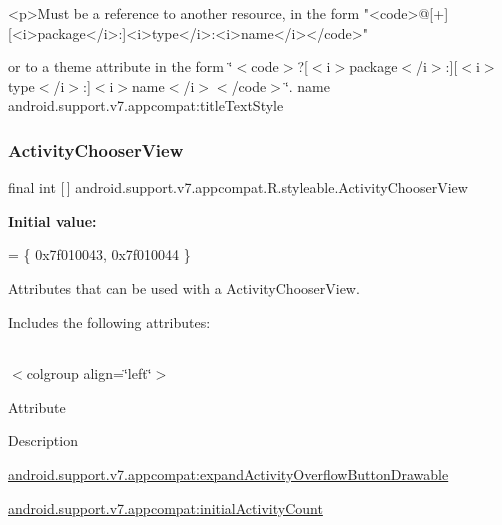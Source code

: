\begin{DoxyVerb}      <p>Must be a reference to another resource, in the form "<code>@[+][<i>package</i>:]<i>type</i>:<i>name</i></code>"
\end{DoxyVerb}
 or to a theme attribute in the form \char`\"{}$<$code$>$?\mbox{[}$<$i$>$package$<$/i$>$\+:\mbox{]}\mbox{[}$<$i$>$type$<$/i$>$\+:\mbox{]}$<$i$>$name$<$/i$>$$<$/code$>$\char`\"{}.  name android.\+support.\+v7.\+appcompat\+:title\+Text\+Style \mbox{\label{classandroid_1_1support_1_1v7_1_1appcompat_1_1R_1_1styleable_a982c115fab0715899d54b7816a21cc47}} 
\subsubsection{\texorpdfstring{Activity\+Chooser\+View}{ActivityChooserView}}
{\footnotesize\ttfamily final int \mbox{[}$\,$\mbox{]} android.\+support.\+v7.\+appcompat.\+R.\+styleable.\+Activity\+Chooser\+View\hspace{0.3cm}{\ttfamily [static]}}

{\bfseries Initial value\+:}
\begin{DoxyCode}
= \{
            0x7f010043, 0x7f010044
        \}
\end{DoxyCode}
Attributes that can be used with a Activity\+Chooser\+View. 

Includes the following attributes\+:

\tabulinesep=1mm
\begin{longtabu} spread 0pt [c]{*{0}{|X[-1]}|}
\hline
\end{longtabu}
$<$colgroup align=\char`\"{}left\char`\"{}$>$ 

Attribute

Description 

{\ttfamily \hyperlink{classandroid_1_1support_1_1v7_1_1appcompat_1_1R_1_1styleable_a42b0a0f293b2f899ebe89cd182dca36f}{android.\+support.\+v7.\+appcompat\+:expand\+Activity\+Overflow\+Button\+Drawable}}

{\ttfamily \hyperlink{classandroid_1_1support_1_1v7_1_1appcompat_1_1R_1_1styleable_ab6826b784285f4584f4c664422674559}{android.\+support.\+v7.\+appcompat\+:initial\+Activity\+Count}}

